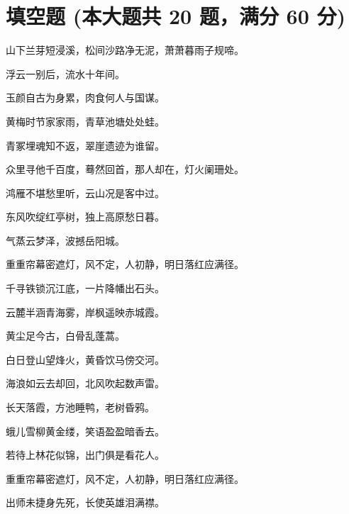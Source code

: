 \documentclass[12pt, a4paper, addpoints]{exam}
\begin{document}
\pagestyle{headandfoot}

\begin{center}
\end{center}
\vspace{5mm}

\normalsize
\vspace{5mm}

\section{\normalsize{填空题 (本大题共 20 题，满分 60 分)}}
\hspace{1.5cm}

\begin{questions}
\question[3] 山下兰芽短浸溪，松间沙路净无泥，萧萧暮雨子规啼。

\question[3] 浮云一别后，流水十年间。

\question[3] 玉颜自古为身累，肉食何人与国谋。

\question[3] 黄梅时节家家雨，青草池塘处处蛙。

\question[3] 青冢埋魂知不返，翠崖遗迹为谁留。

\question[3] 众里寻他千百度，蓦然回首，那人却在，灯火阑珊处。

\question[3] 鸿雁不堪愁里听，云山况是客中过。

\question[3] 东风吹绽红亭树，独上高原愁日暮。

\question[3] 气蒸云梦泽，波撼岳阳城。

\question[3] 重重帘幕密遮灯，风不定，人初静，明日落红应满径。

\question[3] 千寻铁锁沉江底，一片降幡出石头。

\question[3] 云麓半涵青海雾，岸枫遥映赤城霞。

\question[3] 黄尘足今古，白骨乱蓬蒿。

\question[3] 白日登山望烽火，黄昏饮马傍交河。

\question[3] 海浪如云去却回，北风吹起数声雷。

\question[3] 长天落霞，方池睡鸭，老树昏鸦。

\question[3] 蛾儿雪柳黄金缕，笑语盈盈暗香去。

\question[3] 若待上林花似锦，出门俱是看花人。

\question[3] 重重帘幕密遮灯，风不定，人初静，明日落红应满径。

\question[3] 出师未捷身先死，长使英雄泪满襟。

\end{questions}
\end{document}
